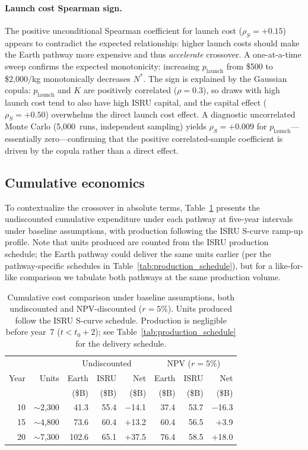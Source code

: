\documentclass[preprint,12pt]{elsarticle}
\begin{document}
\paragraph{Launch cost Spearman sign.} The positive unconditional Spearman coefficient for launch cost ($\rho_S = +0.15$) appears to contradict the expected relationship: higher launch costs should make the Earth pathway more expensive and thus \emph{accelerate} crossover. A one-at-a-time sweep confirms the expected monotonicity: increasing $p_{\mathrm{launch}}$ from \$500 to \$2{,}000/kg monotonically decreases $N^*$. The sign is explained by the Gaussian copula: $p_{\mathrm{launch}}$ and $K$ are positively correlated ($\rho = 0.3$), so draws with high launch cost tend to also have high ISRU capital, and the capital effect ($\rho_S = +0.50$) overwhelms the direct launch cost effect. A diagnostic uncorrelated Monte Carlo (5{,}000~runs, independent sampling) yields $\rho_S = +0.009$ for $p_{\mathrm{launch}}$---essentially zero---confirming that the positive correlated-sample coefficient is driven by the copula rather than a direct effect.

\subsection{Cumulative economics}

To contextualize the crossover in absolute terms, Table~\ref{tab:cumulative} presents the undiscounted cumulative expenditure under each pathway at five-year intervals under baseline assumptions, with production following the ISRU S-curve ramp-up profile. Note that units produced are counted from the ISRU production schedule; the Earth pathway could deliver the same units earlier (per the pathway-specific schedules in Table~\ref{tab:production_schedule}), but for a like-for-like comparison we tabulate both pathways at the same production volume.

\begin{table}[htbp]
\centering
\caption{Cumulative cost comparison under baseline assumptions, both undiscounted and NPV-discounted ($r = 5\%$). Units produced follow the ISRU S-curve schedule. Production is negligible before year~7 ($t < t_0 + 2$); see Table~\ref{tab:production_schedule} for the delivery schedule.}
\label{tab:cumulative}
\begin{tabular}{@{}rr|rrr|rrr@{}}
\toprule
 & & \multicolumn{3}{c|}{Undiscounted} & \multicolumn{3}{c}{NPV ($r = 5\%$)} \\
Year & Units & Earth & ISRU & Net & Earth & ISRU & Net \\
 & & (\$B) & (\$B) & (\$B) & (\$B) & (\$B) & (\$B) \\
\midrule
10 & $\sim$2{,}300 & 41.3  & 55.4   & $-$14.1 & 37.4  & 53.7  & $-$16.3 \\
15 & $\sim$4{,}800 & 73.6  & 60.4   & $+$13.2 & 60.4  & 56.5  & $+$3.9  \\
20 & $\sim$7{,}300 & 102.6 & 65.1   & $+$37.5 & 76.4  & 58.5  & $+$18.0 \\
\bottomrule
\end{tabular}
\end{table}
\end{document}
